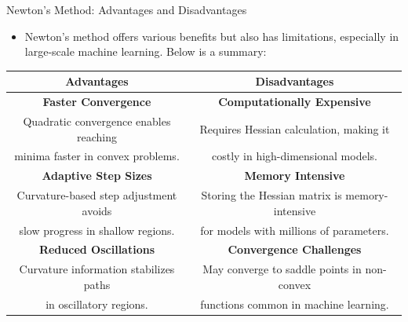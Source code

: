 \documentclass[serif, aspectratio=169]{beamer}
\begin{document}
\begin{frame}{Newton's Method: Advantages and Disadvantages}
    \begin{itemize}
        \item Newton's method offers various benefits but also has limitations, especially in large-scale machine learning. Below is a summary:
    \end{itemize}
    \begin{table}[]
        \centering
        \begin{tabular}{|c|c|}
            \hline
            \textbf{Advantages} & \textbf{Disadvantages} \\
            \hline
            \textbf{Faster Convergence} & \textbf{Computationally Expensive} \\
            Quadratic convergence enables reaching & Requires Hessian calculation, making it\\
            minima faster in convex problems. & costly in high-dimensional models. \\
            \hline
            \textbf{Adaptive Step Sizes} & \textbf{Memory Intensive} \\
            Curvature-based step adjustment avoids & Storing the Hessian matrix is memory-intensive\\
            slow progress in shallow regions. & for models with millions of parameters. \\
            \hline
            \textbf{Reduced Oscillations} & \textbf{Convergence Challenges} \\
            Curvature information stabilizes paths & May converge to saddle points in non-convex\\
            in oscillatory regions. & functions common in machine learning. \\
            \hline
        \end{tabular}
    \end{table}
\end{frame}
\end{document}

